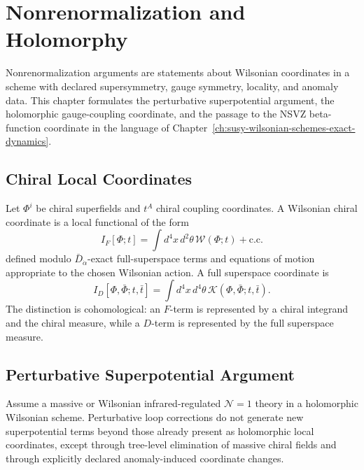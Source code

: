 \chapter{Nonrenormalization and Holomorphy}
\label{ch:susy-nonrenormalization-holomorphy}

\ConventionsLorentzian

Nonrenormalization arguments are statements about Wilsonian coordinates in a
scheme with declared supersymmetry, gauge symmetry, locality, and anomaly
data.  This chapter formulates the perturbative superpotential argument, the
holomorphic gauge-coupling coordinate, and the passage to the NSVZ
beta-function coordinate in the language of
Chapter~\ref{ch:susy-wilsonian-schemes-exact-dynamics}.

\section{Chiral Local Coordinates}

Let \(\Phi^i\) be chiral superfields and \(t^A\) chiral coupling coordinates.
A Wilsonian chiral coordinate is a local functional of the form
\[
  I_F[\Phi;t]
  =
  \int d^4x\,d^2\theta\,
  \mathcal W(\Phi;t)+\text{c.c.}
\]
defined modulo \(\bar D_{\dot\alpha}\)-exact full-superspace terms and
equations of motion appropriate to the chosen Wilsonian action.  A full
superspace coordinate is
\[
  I_D[\Phi,\bar\Phi;t,\bar t]
  =
  \int d^4x\,d^4\theta\,
  \mathcal K(\Phi,\bar\Phi;t,\bar t).
\]
The distinction is cohomological: an \(F\)-term is represented by a chiral
integrand and the chiral measure, while a \(D\)-term is represented by the
full superspace measure.

\section{Perturbative Superpotential Argument}

\begin{controlledapproximation}
\label{ca:perturbative-wilsonian-superpotential}
Assume a massive or Wilsonian infrared-regulated \(\mathcal N=1\) theory in a
holomorphic Wilsonian scheme.  Perturbative loop corrections do not generate
new superpotential terms beyond those already present as holomorphic local
coordinates, except through tree-level elimination of massive chiral fields
and through explicitly declared anomaly-induced coordinate changes.
\end{controlledapproximation}

